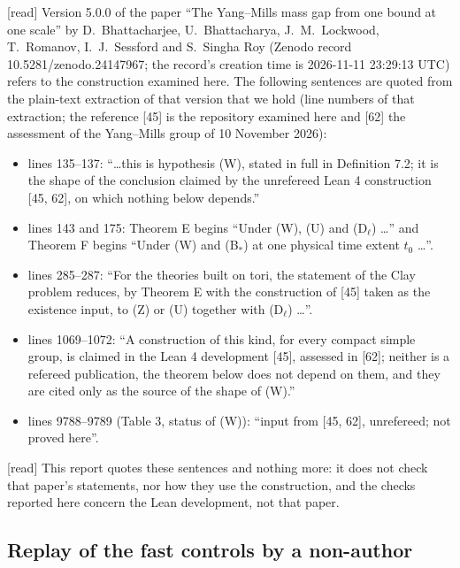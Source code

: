 \documentclass[11pt,a4paper]{article}
\theoremstyle{plain}
\theoremstyle{definition}
\theoremstyle{remark}
\numberwithin{equation}{section}
\newcommand{\st}[1]{\textsf{[#1]}}
\begin{document}
\st{read} Version 5.0.0 of the paper ``The Yang--Mills mass gap from one bound at one scale'' by D.~Bhattacharjee, U.~Bhattacharya, J.~M.~Lockwood, T.~Romanov, I.~J.~Sessford and S.~Singha Roy
(Zenodo record 10.5281/zenodo.24147967; the record's creation time is 2026-11-11 23:29:13 UTC) refers to the construction examined here. The following sentences are quoted
from the plain-text extraction of that version that we hold (line numbers of that extraction; the reference [45] is the repository examined here and [62] the assessment of the Yang--Mills group of 10 November 2026):
\begin{itemize}\small
\item lines 135--137: ``\ldots this is hypothesis (W), stated in full in Definition 7.2; it is the shape of the conclusion claimed by the unrefereed Lean 4 construction [45, 62], on which nothing below depends.''
\item lines 143 and 175: Theorem E begins ``Under (W), (U) and (D$_\ell$) \ldots'' and Theorem F begins ``Under (W) and (B$_*$) at one physical time extent $t_0$ \ldots''.
\item lines 285--287: ``For the theories built on tori, the statement of the Clay problem reduces, by Theorem E with the construction of [45] taken as the existence input, to (Z) or (U) together with (D$_\ell$) \ldots''.
\item lines 1069--1072: ``A construction of this kind, for every compact simple group, is claimed in the Lean 4 development [45], assessed in [62]; neither is a refereed publication, the theorem below does not depend on them, and they are cited only as the source of the shape of (W).''
\item lines 9788--9789 (Table 3, status of (W)): ``input from [45, 62], unrefereed; not proved here''.
\end{itemize}
\st{read} This report quotes these sentences and nothing more: it does not check that paper's statements, nor how they use the construction, and the checks reported here concern the Lean development, not that paper.

\subsection*{Replay of the fast controls by a non-author}\label{sec:replay}
\end{document}
